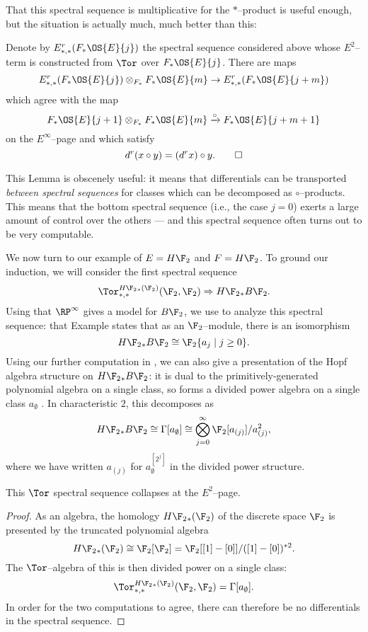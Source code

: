 That this spectral sequence is multiplicative for the $\ast$--product is useful enough, but the situation is actually much, much better than this:
\begin{lemma}\label{CircProductAndDifferentials}
Denote by $E^r_{*, *}(F_* \OS{E}{j})$ the spectral sequence considered above whose $E^2$--term is constructed from $\Tor$ over $F_* \OS{E}{j}$.  There are maps \[E^r_{*, *}(F_* \OS{E}{j}) \otimes_{F_*} F_* \OS{E}{m} \to E^r_{*, *}(F_* \OS{E}{j+m})\] which agree with the map \[F_* \OS{E}{j+1} \otimes_{F_*} F_* \OS{E}{m} \xrightarrow{\circ} F_* \OS{E}{j+m+1}\] on the $E^\infty$--page and which satisfy \[d^r(x \circ y) = (d^r x) \circ y. \qed\]
\end{lemma}
\noindent This Lemma is obscenely useful: it means that differentials can be transported \emph{between spectral sequences} for classes which can be decomposed as $\circ$--products.  This means that the bottom spectral sequence (i.e., the case $j = 0$) exerts a large amount of control over the others --- and this spectral sequence often turns out to be very computable.

We now turn to our example of $E = H\F_2$ and $F = H\F_2$.  To ground our induction, we will consider the first spectral sequence \[\Tor^{H\F_2{}_*(\F_2)}_{*, *}(\F_2, \F_2) \Rightarrow H\F_2{}_* B\F_2.\]  Using that $\RP^\infty$ gives a model for $B\F_2$, we use  to analyze this spectral sequence: that Example states that as an $\F_2$--module, there is an isomorphism \[H\F_2{}_* B\F_2 \cong \F_2\{a_j \mid j \ge 0\}.\]  Using our further computation in , we can also give a presentation of the Hopf algebra structure on $H\F_2{}_* B\F_2$: it is dual to the primitively-generated polynomial algebra on a single class, so forms a divided power algebra on a single class $a_\emptyset$ .  In characteristic $2$, this decomposes as \[H\F_2{}_* B\F_2 \cong \Gamma[a_\emptyset] \cong \bigotimes_{j=0}^\infty \F_2[a_{(j)}] / a_{(j)}^2,\] where we have written $a_{(j)}$ for $a_\emptyset^{[2^j]}$ in the divided power structure.

\begin{corollary}
This $\Tor$ spectral sequence collapses at the $E^2$--page.
\end{corollary}
\begin{proof}
As an algebra, the homology $H\F_2{}_*(\F_2)$ of the discrete space $\F_2$ is presented by the truncated polynomial algebra \[H\F_2{}_*(\F_2) \cong \F_2[\F_2] = \F_2[[1] - [0]] / ([1] - [0])^{\ast 2}.\]  The $\Tor$--algebra of this is then divided power on a single class: \[\Tor^{H\F_2{}_*(\F_2)}_{*, *}(\F_2, \F_2) = \Gamma[a_\emptyset].\]  In order for the two computations to agree, there can therefore be no differentials in the spectral sequence.
\end{proof}

